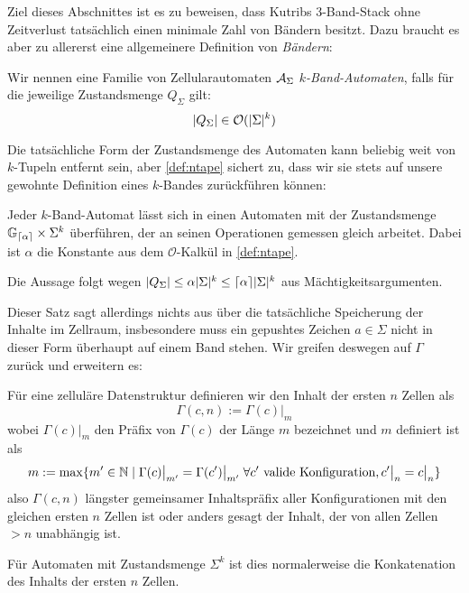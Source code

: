 \documentclass{article}
\begin{document}
Ziel dieses Abschnittes ist es zu beweisen, dass Kutribs 3-Band-Stack ohne Zeitverlust tatsächlich einen minimale Zahl von Bändern besitzt. Dazu braucht es aber zu allererst eine allgemeinere Definition von \emph{Bändern}:
\begin{definition}
    Wir nennen eine Familie von Zellularautomaten $\mathcal{A}_\Sigma$ \emph{$k$-Band-Automaten}, falls für die jeweilige Zustandsmenge $Q_\Sigma$ gilt:
    \begin{equation}
        \lvert Q_\Sigma\rvert \in \mathcal{O}(\lvert\Sigma\rvert^k) \label{def:ntape}
    \end{equation}
\end{definition}

Die tatsächliche Form der Zustandsmenge des Automaten kann beliebig weit von $k$-Tupeln entfernt sein, aber \eqref{def:ntape} sichert zu, dass wir sie stets auf unsere gewohnte Definition eines $k$-Bandes zurückführen können:

\begin{satz}
    \label{thm:tape-hom}
    Jeder $k$-Band-Automat lässt sich in einen Automaten mit der Zustandsmenge $\mathbb{G}_{\lceil\alpha\rceil} \times \Sigma^k$ überführen, der an seinen Operationen gemessen gleich arbeitet. Dabei ist $\alpha$ die Konstante aus dem $\mathcal{O}$-Kalkül in \eqref{def:ntape}.

    \begin{beweis}
        Die Aussage folgt wegen $\lvert Q_\Sigma\rvert \leq \alpha \lvert\Sigma\rvert^k \leq \lceil\alpha\rceil \lvert\Sigma\rvert^k$ aus Mächtigkeitsargumenten.
    \end{beweis}
\end{satz}

Dieser Satz sagt allerdings nichts aus über die tatsächliche Speicherung der Inhalte im Zellraum, insbesondere muss ein gepushtes Zeichen $a \in \Sigma$ nicht in dieser Form überhaupt auf einem Band stehen. Wir greifen deswegen auf $\Gamma$ zurück und erweitern es:

\begin{definition}
    Für eine zelluläre Datenstruktur definieren wir den Inhalt der ersten $n$ Zellen als
        \[ \Gamma(c,n) := \Gamma(c) \big|_m \]
    wobei $\Gamma(c) \big|_m$ den Präfix von $\Gamma(c)$ der Länge $m$ bezeichnet und $m$ definiert ist als
    \[ m := \max \{m' \in \mathbb{N} \mid \Gamma(c) \big|_{m'} = \Gamma(c') \big|_{m'} \;\forall c' \text{ valide Konfiguration}, c' \big|_n = c \big|_n \} \]
    also $\Gamma(c,n)$ längster gemeinsamer Inhaltspräfix aller Konfigurationen mit den gleichen ersten $n$ Zellen ist oder anders gesagt der Inhalt, der von allen Zellen $> n$ unabhängig ist.

    Für Automaten mit Zustandsmenge $\Sigma^k$ ist dies normalerweise die Konkatenation des Inhalts der ersten $n$ Zellen.
\end{definition}
\end{document}
